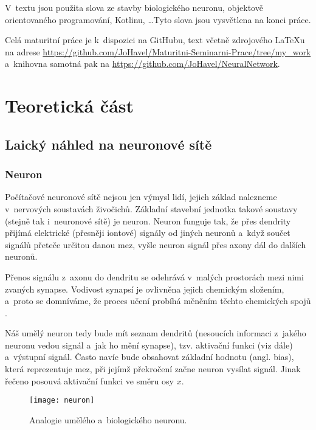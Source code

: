 \documentclass[12pt]{report}			%
\begin{document}
		V~textu jsou použita slova ze stavby biologického neuronu, objektově orientovaného programování, Kotlinu, \ldots Tyto slova jsou vysvětlena na konci práce. 
		
		Celá maturitní práce je k~dispozici na GitHubu, text včetně zdrojového LaTeXu na adrese \url{https://github.com/JoHavel/Maturitni-Seminarni-Prace/tree/my\_work} a~knihovna samotná pak na \url{https://github.com/JoHavel/NeuralNetwork}.
	
	
	\part{Teoretická část}
		
			\chapter{Laický náhled na neuronové sítě}
			
				\section{Neuron}
					Počítačové neuronové sítě nejsou jen výmysl lidí, jejich základ nalezneme v~nervových soustavách živočichů. Základní stavební jednotka takové soustavy (stejně tak i~neuronové sítě) je neuron. Neuron funguje tak, že přes \gls{dendrit}y přijímá elektrické (přesněji iontové) signály od jiných neuronů a~když součet signálů přeteče určitou danou mez, vyšle neuron signál přes \gls{axon}y dál do dalších neuronů.
					
					Přenos signálu z~\gls{axon}u do \gls{dendrit}u se odehrává v~malých prostorách mezi nimi zvaných \gls{synapse}. Vodivost synapsí je ovlivněna jejich chemickým složením, a~proto se domníváme, že proces učení probíhá měněním těchto chemických spojů \autocite[s. 491]{Book:Informatika}.
					
					Náš umělý neuron tedy bude mít seznam \gls{dendrit}ů (nesoucích informaci z~jakého neuronu vedou signál a~jak ho mění \gls{synapse}), tzv. aktivační funkci (viz dále) a~výstupní signál. Často navíc bude obsahovat základní hodnotu (angl. bias), která reprezentuje mez, při jejímž překročení začne neuron vysílat signál. Jinak řečeno posouvá aktivační funkci ve směru osy $x$.
					
					\begin{figure}
						\texttt{[image: neuron]}
						\caption{Analogie umělého a~biologického neuronu.}
						\label{fig:neuron}
					\end{figure}
				
\end{document}
